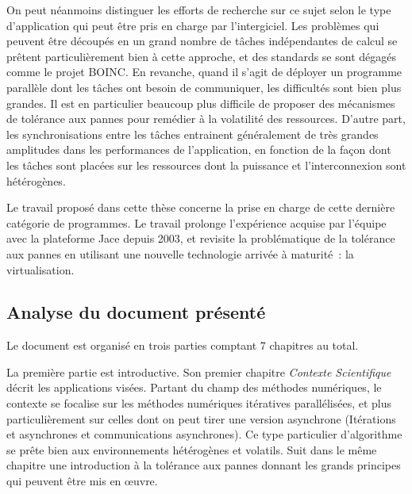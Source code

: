 \documentclass[a4paper,12pt]{article}
\begin{document}
On peut néanmoins distinguer les efforts de recherche sur ce sujet 
selon le type d'application qui peut être pris en charge par 
l'intergiciel. Les problèmes qui peuvent être découpés en un grand
nombre de tâches indépendantes de calcul se prêtent particulièrement
bien à cette approche, et des standards se sont dégagés comme le 
projet BOINC. En revanche, quand il s'agit de déployer un programme
parallèle dont les tâches ont besoin de communiquer, les difficultés
sont bien plus grandes. Il est en particulier beaucoup plus difficile
de proposer des mécanismes de tolérance aux pannes pour remédier à
la volatilité des ressources. D'autre part, les synchronisations entre
les tâches entrainent généralement de très grandes amplitudes dans les 
performances de l'application, en fonction de la façon dont les tâches
sont placées sur les ressources dont la puissance et l'interconnexion
sont hétérogènes.

Le travail proposé dans cette thèse concerne la prise en charge de cette 
dernière catégorie de programmes. Le travail prolonge l'expérience acquise
par l'équipe avec la plateforme Jace depuis 2003, et revisite la
problématique de la tolérance aux pannes en utilisant une nouvelle technologie
arrivée à maturité~: la virtualisation.


\subsection*{Analyse du document présenté}
\vspace{-3mm}
Le document est organisé en trois parties comptant 7 chapitres au total.

La première partie est introductive. Son premier chapitre \textit{Contexte
Scientifique} décrit les applications visées. Partant du champ des méthodes 
numériques, le contexte se focalise sur les méthodes numériques itératives
parallélisées, et plus particulièrement sur celles dont on peut tirer une
version asynchrone (Itérations et asynchrones et communications asynchrones). 
Ce type particulier d'algorithme se prête bien aux environnements hétérogènes
et volatils. Suit dans le même chapitre une introduction à la tolérance
aux pannes donnant les grands principes qui peuvent être mis en {\oe}uvre.
\end{document}
